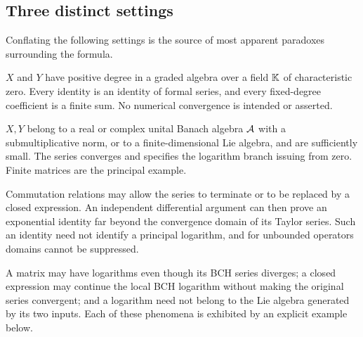 \subsection{Three distinct settings}
Conflating the following settings is the source of most apparent paradoxes
surrounding the formula.
\begin{description}[leftmargin=1.5em,style=nextline]
\item[Formal algebra.] $X$ and $Y$ have positive degree in a graded algebra
over a field $\mathbb{K}$ of characteristic zero. Every identity is an identity of
formal series, and every fixed-degree coefficient is a finite sum. No numerical
convergence is intended or asserted.
\item[Local analysis.] $X,Y$ belong to a real or complex unital Banach algebra
$\mathcal{A}$ with a submultiplicative norm, or to a finite-dimensional Lie algebra,
and are sufficiently small. The series converges and specifies the logarithm
branch issuing from zero. Finite matrices are the principal example.
\item[Global identities under special relations.] Commutation relations may
allow the series to terminate or to be replaced by a closed expression. An
independent differential argument can then prove an exponential identity far
beyond the convergence domain of its Taylor series. Such an identity need not
identify a principal logarithm, and for unbounded operators domains cannot be
suppressed.
\end{description}
A matrix may have logarithms even though its BCH series diverges; a closed
expression may continue the local BCH logarithm without making the original
series convergent; and a logarithm need not belong to the Lie algebra generated
by its two inputs. Each of these phenomena is exhibited by an explicit example
below.

